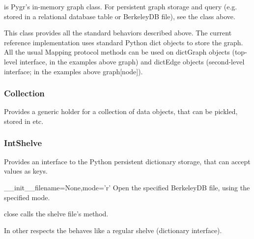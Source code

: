 \documentclass{howto}
\begin{document}
 is Pygr's in-memory graph class.  For persistent
graph storage and query (e.g. stored in a relational database table
or BerkeleyDB file), see the  class above.

This class provides all the standard behaviors described above.  The current reference implementation uses standard Python dict objects to store the graph.  All the usual Mapping protocol methods can be used on dictGraph objects (top-level interface, in the examples above graph) and dictEdge objects (second-level interface; in the examples above graph[node]).

\subsubsection{Collection}
Provides a generic holder for a collection of data objects, that can be
pickled, stored in  etc.

\subsubsection{IntShelve}
Provides an interface to the Python  persistent dictionary
storage, that can accept  values as keys.
\begin{funcdesc}{__init__}{filename=None,mode='r'}
  Open the specified  BerkeleyDB file, using the specified
  mode.
\end{funcdesc}

\begin{funcdesc}{close}{}
  calls the shelve file's  method.
\end{funcdesc}
In other respects the  behaves like a regular shelve
(dictionary interface).





\end{document}
